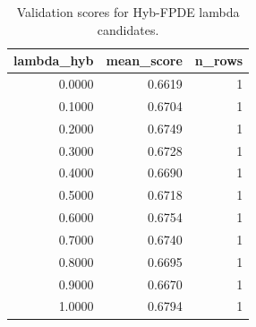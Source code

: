 \begin{table}[t]
\caption{Validation scores for Hyb-FPDE lambda candidates.}
\label{tab:lambda_distribution_computed}
\centering
\begin{tabular}{rrr}
\toprule
lambda\_hyb & mean\_score & n\_rows \\
\midrule
0.0000 & 0.6619 & 1 \\
0.1000 & 0.6704 & 1 \\
0.2000 & 0.6749 & 1 \\
0.3000 & 0.6728 & 1 \\
0.4000 & 0.6690 & 1 \\
0.5000 & 0.6718 & 1 \\
0.6000 & 0.6754 & 1 \\
0.7000 & 0.6740 & 1 \\
0.8000 & 0.6695 & 1 \\
0.9000 & 0.6670 & 1 \\
1.0000 & 0.6794 & 1 \\
\bottomrule
\end{tabular}

\end{table}
